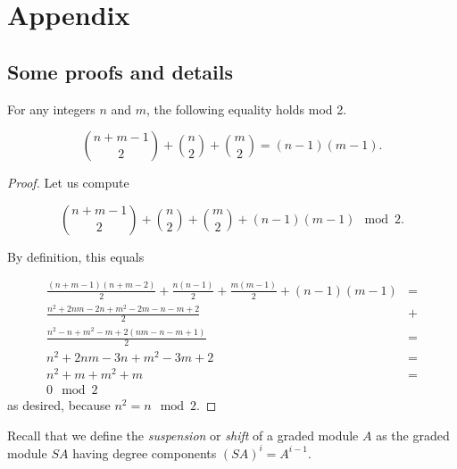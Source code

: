 \documentclass[Thesis.tex]{subfiles}
\begin{document}
\chapter*{Appendix}
\appendix
\setcounter{equation}{0}
\gdef\thesection{\Alph{section}}
\section{Some proofs and details}\label{AppA}



\begin{lem}\label{binom}
For any integers $n$ and $m$, the following equality holds mod 2.

\[\binom{n+m-1}{2}+\binom{n}{2}+\binom{m}{2}=(n-1)(m-1).\]
\end{lem}
\begin{proof}
Let us compute 

\[\binom{n+m-1}{2}+\binom{n}{2}+\binom{m}{2}+(n-1)(m-1)\mod 2.\]

By definition, this equals

\begin{align*}
\frac{(n+m-1)(n+m-2)}{2}+\frac{n(n-1)}{2}+\frac{m(m-1)}{2}+(n-1)(m-1)&=\\
\frac{n^2+2nm-2n+m^2-2m-n-m+2}{2}&+\\
\frac{n^2-n+m^2-m+2(nm-n-m+1)}{2}&=\\
n^2+2nm-3n+m^2-3m+2&=\\
n^2+m+m^2+m&=\\
0\mod 2
\end{align*}
as desired, because $n^2=n\mod 2$.


\end{proof}




Recall that we define the \emph{suspension} or \emph{shift} of a graded module $A$ as the graded module $S A$ having degree components $(S A)^i=A^{i-1}$.
\end{document}
